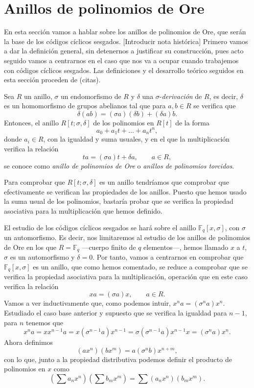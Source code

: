 \chapter{Anillos de polinomios de Ore}

En esta sección vamos a hablar sobre los anillos de polinomios de Ore, que serán la base de los códigos cíclicos sesgados.
[Introducir nota histórica]
Primero vamos a dar la definición general, sin detenernos a justificar su construcción, pues acto seguido vamos a centrarnos en el caso que nos va a ocupar cuando trabajemos con códigos cíclicos sesgados.
Las definiciones y el desarrollo teórico seguidos en esta sección proceden de (citas).

\begin{definition}
  Sea \(R\) un anillo, \(\sigma\) un endomorfismo de \(R\) y \(\delta\) una \(\sigma\)-\textit{derivación} de \(R\), es decir, \(\delta\) es un homomorfismo de grupos abelianos tal que para \(a, b \in R\) se verifica que
  \[
    \delta(ab) = (\sigma a)(\delta b) + (\delta a)b.
  \]
  Entonces, el anillo \(R[t; \sigma, \delta]\) de los polinomios en \(R[t]\) de la forma
  \[
    a_0 + a_1t + \dots + a_nt^n,
  \]
  donde \(a_i \in R\), con la igualdad y suma usuales, y en el que la multiplicación verifica la relación 
  \[
  ta = (\sigma a)t + \delta a, \qquad a \in R,
  \]
  se conoce como \textit{anillo de polinomios de Ore} o \textit{anillos de polinomios torcidos}.
\end{definition}

Para comprobar que \(R[t; \sigma, \delta]\) es un anillo tendríamos que comprobar que efectivamente se verifican las propiedades de los anillos.
Puesto que hemos usado la suma usual de los polinomios, bastaría probar que se verifica la propiedad asociativa para la multiplicación que hemos definido.

El estudio de los códigos cíclicos sesgados se hará sobre el anillo \(\mathbb F_q[x, \sigma]\), con \(\sigma\) un automorfismo.
Es decir, nos limitaremos al estudio de los anillos de polinomios de Ore en los que \(R = \mathbb F_q\) —cuerpo finito de \(q\) elementos—, hemos llamado \(x\) a \(t\), \(\sigma\) es un automorfismo y \(\delta = 0\).
Por tanto, vamos a centrarnos en comprobar que \(\mathbb F_q[x, \sigma]\) es un anillo, que como hemos comentado, se reduce a comprobar que se verifica la propiedad asociativa para la multiplicación, operación que en este caso verifica la relación 
\[
  xa = (\sigma a)x, \qquad a \in R.
\]
Vamos a ver inductivamente que, como podemos intuir, \(x^n a = (\sigma^n a)x^n\). 
Estudiado el caso base anterior y supuesto que se verifica la igualdad para \(n - 1\), para \(n\) tenemos que
\[
  x^{n}a = xx^{n - 1}a = x(\sigma^{n-1} a)x^{n-1} = \sigma(\sigma^{n-1} a)x^{n-1}x = (\sigma^{n}a)x^{n}.
\]
Ahora definimos
\[
  (ax^n)(bx^m) = a(\sigma^n b)x^{n+m},
\]
con lo que, junto a la propiedad distributiva podemos definir el producto de polinomios en \(x\) como
\[
  \textstyle(\sum a_nx^n)(\sum b_mx^m) = \sum(a_nx^n)(b_mx^m).
\]